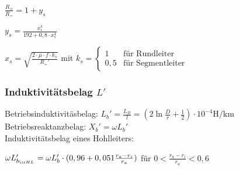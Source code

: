 \documentclass[fs, footer]{latex4ei}
\begin{document}
\begin{multicols*}{4}
{$\frac{R_{\approx}}{R_{=}} = 1 + y_s$

$y_s = \frac{x_s^4}{192 + 0,8 \cdot x_s^4}$

$x_s = \sqrt{\frac{2 \cdot \mu \cdot f \cdot k_s}{R_{=}'}} $ mit $k_s = \begin{cases}
1 & \text{für Rundleiter} \\ 0,5 & \text{für Segmentleiter}
\end{cases}$
\subsubsection{Induktivitätsbelag $L'$}
Betriebsinduktivitäsbelag: $L_b' = \frac{L_B}{l} = \left( 2 \ln \frac{D}{r}+ \frac{1}{2} \right) \cdot 10^{-4} \si{\henry \per \kilo \meter}$ \\

Betriebsreaktanzbelag: $X_b ' = \omega	L_b ' $ \\ 

Induktivitätsbelag eines Hohlleiters:

$\omega L_{b_{\ir HL}}' = \omega L_{b}' \cdot ( 0,96 + 0,051 \frac{r_a - r_i}{r_a})$ für $0 < \frac{r_a - r_i}{r_a} < 0,6$
\\
}



\end{multicols*}
\end{document}
